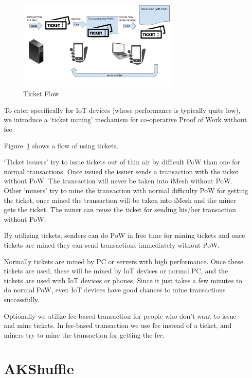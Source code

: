 \documentclass[a4paper,10pt,twocolumn]{article}
\begin{document}
	\begin{figure}[ht]
		\begin{center}
		\includegraphics[width=80mm]{ticket.png}
		  \caption{Ticket Flow}
		\label{fig:ticket}
		\end{center}
	 \end{figure}
	

	To cater specifically for IoT devices (whose performance is typically quite low), we introduce a `ticket mining' mechanism for co-operative Proof of Work without fee.

Figure~\ref{fig:ticket} shows a flow of using tickets.

	`Ticket issuers' try to issue tickets out of thin air by difficult PoW than one for normal transactions. Once issued the issuer sends a transaction with the ticket without PoW.
	The transaction will never be taken into iMesh without PoW.
	Other `miners' try to mine the transaction with normal difficulty PoW for getting the ticket, once mined the transaction will be taken into iMesh and the miner gets the ticket.
	The miner can reuse the ticket for sending his/her transaction without PoW.

	By utilizing tickets, senders can do PoW in free time for mining tickets and once  tickets are mined they can send transactions immediately without PoW.

	Normally tickets are mined by PC or servers with high performance. Once these tickets are used, these will be mined by IoT devices or normal PC, and the tickets are used with
	IoT devices or phones. Since it just takes a few minutes to do normal PoW, even IoT devices have good chances to mine transactions successfully.

	Optionally we utilize fee-based transaction for people who don't want to issue and mine tickets. In fee-based transaction we use fee instead of a ticket, and miners
	try to mine the transaction for getting the fee.
	
	\section{AKShuffle}
	\label{sec:aks}
	
\end{document}
